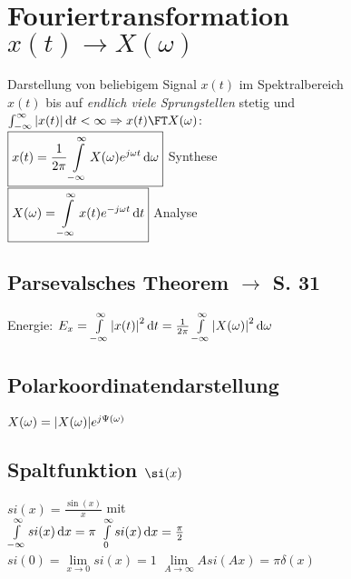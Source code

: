 \documentclass[german]{latex4ei/latex4ei_sheet}
\renewcommand{\diff}{\mathop{}\!\mathrm{\vphantom( d}}
\begin{document}
	\begin{minipage}{\columnwidth}
	\section{Fouriertransformation $x(t)
		 \rightarrow X(\omega)$}
		 	\begin{sectionbox}
	Darstellung von beliebigem Signal $x(t)$ im Spektralbereich\\
	$x(t)$ bis auf \emph{endlich viele Sprungstellen} stetig und $\int_{-\infty}^{\infty}{\abs{x(t)} \diff t} < \infty \Rightarrow x(t) \FT X(\omega)$:\\
	$\boxed{
		x(t) = \frac{1}{2 \pi}\int\limits_{-\infty}^{\infty}{X(\omega) e^{j \omega t} \diff \omega}
	}$ \hfill Synthese\\
	$\boxed{
		X(\omega) = \int\limits_{-\infty}^{\infty}{x(t) e^{-j \omega t} \diff t}
	}$ \hfill Analyse
		
		\subsection*{Parsevalsches Theorem $\rightarrow$ S. 31}
		Energie: $E_x = \int\limits_{-\infty}^{\infty}{\abs{x(t)}^2 \diff t} = \frac{1}{2 \pi}\int\limits_{-\infty}^{\infty}{\abs{X(\omega)}^2 \diff \omega}$
		
		\subsection*{Polarkoordinatendarstellung}
		$X(\omega) = \abs{X(\omega)} e^{j \Psi(\omega)}$
		
		\subsection*{Spaltfunktion $\si(x)$}
		$si(x) = \frac{\sin{(x)}}{x}$ mit\\
		$\int\limits_{-\infty}^{\infty}{si(x) \diff x} = \pi$ \hfill $\int\limits_{0}^{\infty}{si(x) \diff x} = \frac{\pi}{2}$\\
		$si(0) = \lim\limits_{x \rightarrow 0}{si(x)} = 1$ \hfill $\lim\limits_{A \rightarrow \infty}{A si(A x)} = \pi \delta(x)$
		

\end{sectionbox}
\end{minipage}
\end{document}
